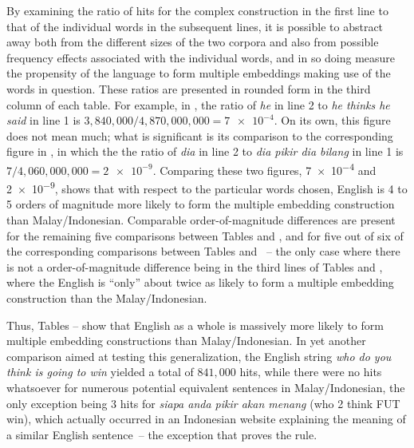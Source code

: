 \documentclass[output=paper,colorlinks,citecolor=brown
]{langscibook}
\begin{document}
By examining the ratio of hits for the complex construction in the first line to that of the individual words in the subsequent lines, it is possible to abstract away both from the different sizes of the two corpora and also from possible frequency effects associated with the individual words, and in so doing measure the propensity of the language to form multiple embeddings making use of the words in question.  These ratios are presented in rounded form in the third column of each table.  For example, in , the ratio of \textit{he} in line 2 to \textit{he thinks he said} in line 1 is $3,840,000 / 4,870,000,000 = \num{7e-4}$.  On its own, this figure does not mean much; what is significant is its comparison to the corresponding figure in , in which the the ratio of \textit{dia} in line 2 to \textit{dia pikir dia bilang} in line 1 is $7 / 4,060,000,000 = \num{2e-9}$.  Comparing these two figures, \num{7e-4} and \num{2e-9}, shows that with respect to the particular words chosen, English is 4 to 5 orders of magnitude more likely to form the multiple embedding construction than Malay\slash Indonesian.  Comparable order-of-magnitude differences are present for the remaining five comparisons between Tables  and , and for five out of six of the corresponding comparisons between Tables  and ~– the only case where there is not a order-of-magnitude difference being in the third lines of Tables  and , where the English is ``only'' about twice as likely to form a multiple embedding construction than the Malay\slash Indonesian.

Thus, Tables -- show that English as a whole is massively more likely to form multiple embedding constructions than Malay\slash Indonesian.  In yet another comparison aimed at testing this generalization, the English string \textit{who do you think is going to win} yielded a total of $841,000$ hits, while there were no hits whatsoever for numerous potential equivalent sentences in Malay\slash Indonesian, the only exception being 3 hits for \textit{siapa anda pikir akan menang} (who 2 think FUT win), which actually occurred in an Indonesian website explaining the meaning of a similar English sentence~– the exception that proves the rule.
\end{document}
